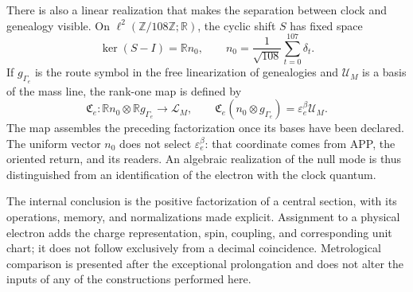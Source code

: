 There is also a linear realization that makes the separation
between clock and genealogy visible. On
\(\ell^2(\mathbb Z/108\mathbb Z;\mathbb R)\), the cyclic
shift \(S\) has fixed space
\[
 \ker(S-I)=\mathbb R n_0,\qquad
 n_0=\frac1{\sqrt{108}}\sum_{t=0}^{107}\delta_t.
\]
If \(g_{\Gamma_e}\) is the route symbol in the free linearization
of genealogies and \(\mathcal U_M\) is a basis of the mass line,
the rank-one map is defined by
\begin{equation}
 \mathfrak C_e:
 \mathbb R n_0\otimes\mathbb R g_{\Gamma_e}\longrightarrow\mathcal L_M,
 \qquad
 \mathfrak C_e(n_0\otimes g_{\Gamma_e})
 =\varepsilon_e^\beta\mathcal U_M.
 \label{eq:el-rango-uno}
\end{equation}
The map assembles the preceding factorization once its bases have been declared.
The uniform vector \(n_0\) does not select \(\varepsilon_e^\beta\):
that coordinate comes from APP, the oriented return, and its readers.
An algebraic realization of the null mode is thus distinguished from an
identification of the electron with the clock quantum.

The internal conclusion is the positive factorization of a central
section, with its operations, memory, and normalizations made explicit. Assignment
to a physical electron adds the charge representation,
spin, coupling, and corresponding unit chart; it does not
follow exclusively from a decimal coincidence. Metrological
comparison is presented after the exceptional prolongation and does not alter
the inputs of any of the constructions performed here.




